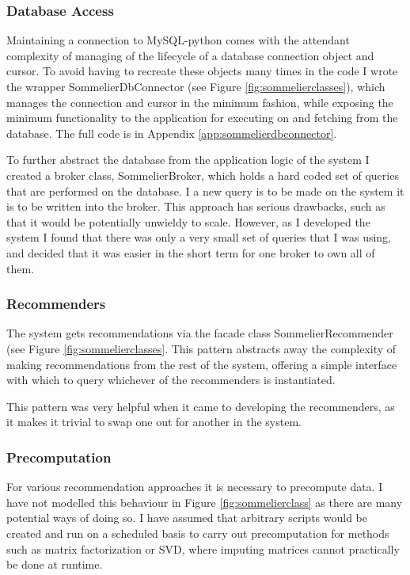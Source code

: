 \subsubsection{Database Access}

Maintaining a connection to MySQL-python comes with the attendant complexity of managing of the lifecycle of a database connection object and cursor. To avoid having to recreate these objects many times in the code I wrote the wrapper SommelierDbConnector (see Figure \ref{fig:sommelierclasses}), which manages the connection and cursor in the minimum fashion, while exposing the minimum functionality to the application for executing on and fetching from the database. The full code is in Appendix \ref{app:sommelierdbconnector}.

To further abstract the database from the application logic of the system I created a broker class, SommelierBroker, which holds a hard coded set of queries that are performed on the database. I a new query is to be made on the system it is to be written into the broker. This approach has serious drawbacks, such as that it would be potentially unwieldy to scale. However, as I developed the system I found that there was only a very small set of queries that I was using, and decided that it was easier in the short term for one broker to own all of them.

\subsubsection{Recommenders}

The system gets recommendations via the facade class SommelierRecommender (see Figure \ref{fig:sommelierclasses}. This pattern abstracts away the complexity of making recommendations from the rest of the system, offering a simple interface with which to query whichever of the recommenders is instantiated. 

This pattern was very helpful when it came to developing the recommenders, as it makes it trivial to swap one out for another in the system.

\subsubsection{Precomputation}

For various recommendation approaches it is necessary to precompute data. I have not modelled this behaviour in Figure \ref{fig:sommelierclass} as there are many potential ways of doing so. I have assumed that arbitrary scripts would be created and run on a scheduled basis to carry out precomputation for methods such as matrix factorization or SVD, where imputing matrices cannot practically be done at runtime.


